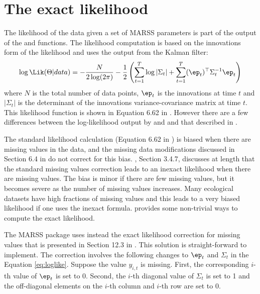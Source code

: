 \section{The exact likelihood}
\label{sec:exactlikelihood}
The likelihood of the data given a set of MARSS parameters is part of the output of the \verb@MARSSkfss@{} and \verb@MARSSkfas@{}
 functions.  The likelihood computation is based on the innovations form of the likelihood \citep{Schweppe1965} and uses the output from the Kalman filter:
\begin{equation}
\log \Lik(\Theta | data) = -\frac{N}{2\log(2\pi)} - \frac{1}{2}\left( \sum_{t=1}^T\log |\Sigma_t| + \sum_{t=1}^T (\ep_t)^\top \Sigma_t^{-1} \ep_t \right)
\label{eq:loglike}
\end{equation}
where $N$ is the total number of data points, $\ep_t$ is the innovations at time $t$ and $|\Sigma_t|$ is the determinant of the innovations variance-covariance matrix at time $t$.  This likelihood function is shown in Equation 6.62 in \citet{ShumwayStoffer2006}. However there are a few differences between the log-likelihood output by \verb@MARSSkf@{} and \verb@MARSSkfas@{} and that described in \citet{ShumwayStoffer2006}.

The standard likelihood calculation (Equation 6.62 in \citet{ShumwayStoffer2006}) is biased when there are missing values in the data, and the missing data modifications discussed in Section 6.4 in \citet{ShumwayStoffer2006} do not correct for this bias. \citet{Harvey1989}, Section 3.4.7, discusses at length that the standard missing values correction leads to an inexact likelihood when there are missing values. The bias is minor if there are few missing values, but it becomes severe as the number of missing values increases.  Many ecological datasets have high fractions of missing values and this  leads to a very biased likelihood if one uses the inexact formula.  \citet{Harvey1989} provides some non-trivial ways to compute the exact likelihood.  

The MARSS package uses instead the exact likelihood correction for missing values that is presented in Section 12.3 in \citet{BrockwellDavis1991}.  This solution is straight-forward to implement.  The correction involves the following changes to $\ep_t$ and $\Sigma_t$ in the Equation \ref{eq:loglike}.  Suppose the value $y_{i,t}$ is missing.  First, the corresponding $i$-th value of $\ep_t$ is set to 0.  Second, the $i$-th diagonal value of $\Sigma_t$ is set to 1 and the off-diagonal elements on the $i$-th column and $i$-th row are set to 0.

